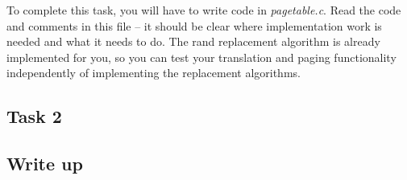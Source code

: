 \documentclass[12pt]{article}
\begin{document}
\bigskip

\noindent To complete this task, you will have to write code in \textit{pagetable.c}. Read the code
and comments in this file -- it should be clear where implementation work is
needed and what it needs to do. The rand replacement algorithm is already implemented
for you, so you can test your translation and paging functionality independently
of implementing the replacement algorithms.

\subsection{Task 2}

\bigskip

\subsection{Write up}
\end{document}
